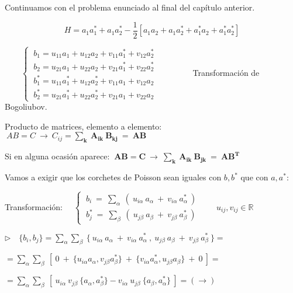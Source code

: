 Continuamos con el problema enunciado al final del capítulo anterior.

\begin{ejercicio}
\vspace{2mm}
$$H=a_1a_1^*+a_1a_2^*-\dfrac 1 2 [a_1a_2+a_1a_2^*+a_1^*a_2+a_1^*a_2^*]$$
 
 
$\qquad  \begin{cases}
 \ b_1=u_{11}a_1+u_{12}a_2+v_{11}a_1^*+v_{12}a_2^* \\
 \ b_2=u_{21}a_1+u_{22}a_2+v_{21}a_1^*+v_{22}a_2^* \\  
 \ b_1^*=u_{11}a_1^*+u_{12}a_2^*+v_{11}a_1+v_{12}a_2 \\
 \ b_2^*=u_{21}a_1^*+u_{22}a_2^*+v_{21}a_1+v_{22}a_2  	
 \end{cases}\qquad \qquad $ Transformación de Bogoliubov.

\vspace{3mm}
\end{ejercicio}

\textcolor{gris}{Producto de matrices, elemento a elemento: $\   AB=C \ \to \ C_{ij}=\boldsymbol{ \displaystyle \sum_k \ A_{ik} \ B_{kj} \ = \ AB  } $ }

\textcolor{gris}{Si en alguna ocasión aparece: $\ \boldsymbol{  AB=C \ \to \ \displaystyle \sum_k \ A_{ik} \ B_{jk} \ = \ AB^T } $ }

\vspace{5mm} Vamos a exigir que los corchetes de Poisson sean iguales con $b,b^*$ que con $a,a^*$:

Transformación: $\quad \begin{cases} \ b_i\ = \ \displaystyle \sum_\alpha \ (\ u_{i\alpha} \ a_\alpha \ + \ v_{i\alpha} \ a^*_\alpha \ )  \\ \ b_j^* \ = \ \displaystyle \sum_\beta \ (\ u_{j\beta}\ a_\beta \ + \ v_{j\beta} \ a^*_\beta\ ) \end{cases} \qquad u_{ij}, v_{ij} \in \mathbb R$

$\triangleright \quad \{b_i,b_j\}=\displaystyle \sum_\alpha \sum_\beta \ \{ \ u_{i\alpha} \ a_\alpha \ + \ v_{i\alpha} \ a^*_\alpha \ , \ u_{j\beta} \ a_\beta \ + \ v_{j\beta} \ a^*_\beta \ \} =$

$=\displaystyle \sum_\alpha \sum_\beta \ \left[\  0\ + \ \{u_{i\alpha}a_\alpha,v_{j\beta}a_\beta^*\} \ + \ \{v_{i\alpha}a_\alpha^*,u_{j\beta}a_\beta\}\ + \ 0 \ \right] =$

$=\displaystyle \sum_\alpha \sum_\beta \ \left[ \ 
u_{i\alpha}\ v_{j\beta} \ \{a_\alpha,a_\beta^*\} \ \boldsymbol{-} \ v_{i\alpha}\ u_{j\beta} \  \{a_\beta,a_\alpha^*\} \ \right] = (\to)$



